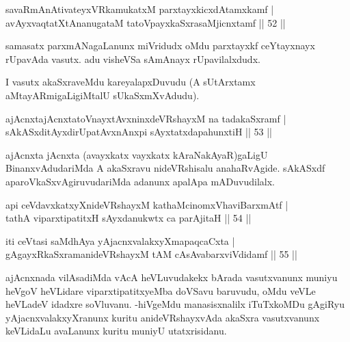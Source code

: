 
\begin{shl}
savaRmAnAtivateyxVRkamukatxM parxtayxkicxdAtamxkamf |\\
avAyxvaqtatXtAnanugataM tatoV\s payxkaSxrasaMjicnxtamf \hfill || 52 ||
\end{shl}

\begin{artha}
samasatx parxmANagaLanunx miVridudx oMdu parxtayxkf ceYtayxnayx rUpavAda vasutx. adu visheVSa sAmAnayx rUpavilalxdudx.

I vasutx akaSxraveMdu kareyalapxDuvudu (A sUtArxtamx aMtayARmigaLigiMtalU sUkaSxmXvAdudu).
\end{artha}


\begin{shl}
ajAcnxtajAcnxtatoV\s nayxtAvxninxdeVRshayxM na tadakaSxramf |\\
sAkASxditAyxdirUpatAvxnAnxpi sAyxtatxdapahunxtiH \hfill || 53 ||
\end{shl}

\begin{artha}
ajAcnxta jAcnxta (avayxkatx vayxkatx kAraNakAyaR)gaLigU BinanxvAdudariMda A akaSxravu nideVRshisalu anahaRvAgide. sAkASxdf aparoVkaSxvAgiruvudariMda adanunx apalApa mADuvudilalx.
\end{artha}%

\begin{shl}
api ceVdavxkatxyXnideVRshayxM kathaMcinomxVhaviBarxmAtf |\\
tathA viparxtipatitxH sAyxdanukwtx ca parAjitaH \hfill || 54 ||
\end{shl}

\begin{shl}
iti ceVtasi saMdhAya yAjacnxvalakxyXmapaqcaCxta |\\
gAgayxRkaSxramanideVRshayxM tAM cAsAvabarxviVdidamf \hfill || 55 ||
\end{shl}

\begin{artha}
ajAcnxnada vilAsadiMda vAcA heVLuvudakekx bArada vasutxvanunx muniyu heVgoV heVLidare viparxtipatitxyeMba doVSavu baruvudu, oMdu veVLe heVLadeV idadxre soVluvanu. -hiVgeMdu manasisxnalilx iTuTxkoMDu gAgiRyu yAjacnxvalakxyXranunx kuritu anideVRshayxvAda akaSxra vasutxvanunx keVLidaLu avaLanunx kuritu muniyU utatxrisidanu.
\end{artha}

